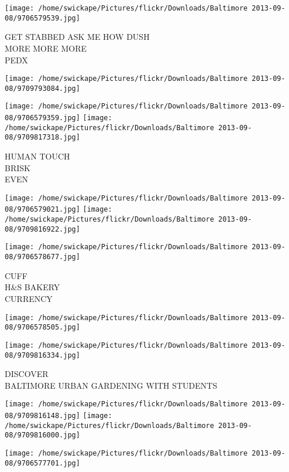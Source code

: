 \documentclass[10pt,letterpaper]{article}
\begin{document}
\texttt{[image: /home/swickape/Pictures/flickr/Downloads/Baltimore 2013-09-08/9706579539.jpg]}

GET STABBED ASK ME HOW DUSH\\
MORE MORE MORE\\
PEDX\\
\pagebreak

\texttt{[image: /home/swickape/Pictures/flickr/Downloads/Baltimore 2013-09-08/9709793084.jpg]}

\vspace{0.25in}
\texttt{[image: /home/swickape/Pictures/flickr/Downloads/Baltimore 2013-09-08/9706579359.jpg]}
\texttt{[image: /home/swickape/Pictures/flickr/Downloads/Baltimore 2013-09-08/9709817318.jpg]}

HUMAN TOUCH\\
BRISK\\
EVEN\\
\pagebreak

\texttt{[image: /home/swickape/Pictures/flickr/Downloads/Baltimore 2013-09-08/9706579021.jpg]}
\texttt{[image: /home/swickape/Pictures/flickr/Downloads/Baltimore 2013-09-08/9709816922.jpg]}

\texttt{[image: /home/swickape/Pictures/flickr/Downloads/Baltimore 2013-09-08/9706578677.jpg]}

CUFF\\
H\&S BAKERY\\
CURRENCY\\
\pagebreak

\texttt{[image: /home/swickape/Pictures/flickr/Downloads/Baltimore 2013-09-08/9706578505.jpg]}

\vspace{0.25in}
\texttt{[image: /home/swickape/Pictures/flickr/Downloads/Baltimore 2013-09-08/9709816334.jpg]}

DISCOVER\\
BALTIMORE URBAN GARDENING WITH STUDENTS\\
\pagebreak

\texttt{[image: /home/swickape/Pictures/flickr/Downloads/Baltimore 2013-09-08/9709816148.jpg]}
\texttt{[image: /home/swickape/Pictures/flickr/Downloads/Baltimore 2013-09-08/9709816000.jpg]}

\vspace{0.25in}
\texttt{[image: /home/swickape/Pictures/flickr/Downloads/Baltimore 2013-09-08/9706577701.jpg]}
\end{document}
